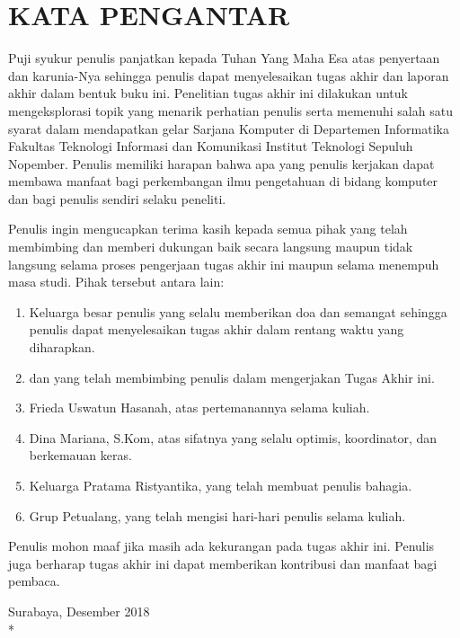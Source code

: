 \chapter {KATA PENGANTAR}

Puji syukur penulis panjatkan kepada Tuhan Yang Maha Esa atas penyertaan dan karunia-Nya sehingga penulis dapat menyelesaikan tugas akhir dan laporan akhir dalam bentuk buku ini. Penelitian tugas akhir ini dilakukan untuk mengeksplorasi topik yang menarik perhatian penulis serta memenuhi salah satu syarat dalam mendapatkan gelar Sarjana Komputer di Departemen Informatika Fakultas Teknologi Informasi dan Komunikasi Institut Teknologi Sepuluh Nopember. Penulis memiliki harapan bahwa apa yang penulis kerjakan dapat membawa manfaat bagi perkembangan ilmu pengetahuan di bidang komputer dan bagi penulis sendiri selaku peneliti.

Penulis ingin mengucapkan terima kasih kepada semua pihak yang telah membimbing dan memberi dukungan baik secara langsung maupun tidak langsung selama proses pengerjaan tugas akhir ini maupun selama menempuh masa studi. Pihak tersebut antara lain:

\begin {enumerate}
    \item Keluarga besar penulis yang selalu memberikan doa dan semangat sehingga penulis dapat menyelesaikan tugas akhir dalam rentang waktu yang diharapkan. 
    \item \pembimbingsatu dan \pembimbingdua yang telah membimbing penulis dalam mengerjakan Tugas Akhir ini.
    \item Frieda Uswatun Hasanah, atas pertemanannya selama kuliah.
    \item Dina Mariana, S.Kom, atas sifatnya yang selalu optimis, koordinator, dan berkemauan keras.
    \item Keluarga Pratama Ristyantika, yang telah membuat penulis bahagia.
    \item Grup Petualang, yang telah mengisi hari-hari penulis selama kuliah.
\end {enumerate}

Penulis mohon maaf jika masih ada kekurangan pada tugas akhir ini. Penulis juga berharap tugas akhir ini dapat memberikan kontribusi dan manfaat bagi pembaca.

\begin{flushright}
Surabaya, Desember 2018 \\*
\vspace{5em}
\penulis
\end{flushright}
